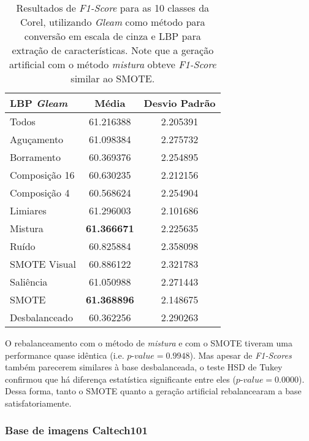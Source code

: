 \begin{table}[H]
\begin{center}
\caption{Resultados de \textit{F1-Score} para as 10 classes da Corel, utilizando \emph{Gleam} como método para conversão em escala de cinza e LBP para extração de características. Note que a geração artificial com o método \emph{mistura} obteve \textit{F1-Score} similar ao SMOTE.}
\label{tab:resultados:3.1}
\begin{tabular}{|l|c|c|}
\hline
\textbf{LBP \emph{Gleam}} & \textbf{Média}     & \textbf{Desvio Padrão} \\ \hline
   Todos        &  61.216388 &  2.205391  \\ \hline
  Aguçamento    &  61.098384 &  2.275732  \\ \hline
  Borramento    &  60.369376 &  2.254895  \\ \hline
  Composição 16 &  60.630235 &  2.212156  \\ \hline
  Composição 4  &  60.568624 &  2.254904  \\ \hline
  Limiares      &  61.296003 &  2.101686  \\ \hline
  Mistura       &  \textbf{61.366671} &  2.225635  \\ \hline
  Ruído         &  60.825884 &  2.358098  \\ \hline
  SMOTE Visual  &  60.886122 &  2.321783  \\ \hline
  Saliência     &  61.050988 &  2.271443  \\ \hline
 SMOTE          &  \textbf{61.368896} &  2.148675  \\ \hline
Desbalanceado   &  60.362256 &  2.290263  \\ \hline
\end{tabular}
\end{center}
\end{table}


O rebalanceamento com o método de \emph{mistura} e com o SMOTE tiveram uma performance quase idêntica (i.e. $\textit{p-value} = 0.9948$). Mas apesar de \textit{F1-Scores} também parecerem similares à base desbalanceada, o teste HSD de Tukey confirmou que há diferença estatística significante entre eles ($\textit{p-value} = 0.0000$). Dessa forma, tanto o SMOTE quanto a geração artificial rebalancearam a base satisfatoriamente.

\subsubsection{Base de imagens Caltech101}

